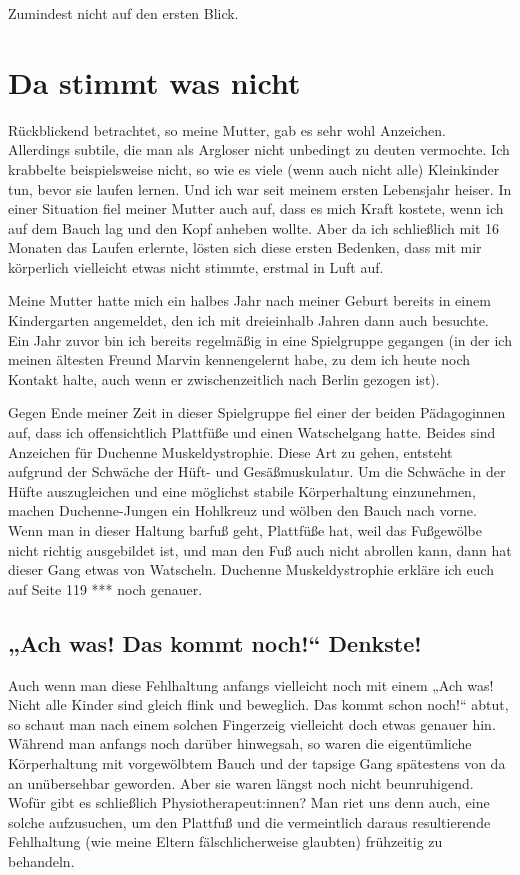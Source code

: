 \documentclass[fontsize=14pt,a4paper,headinclude,DIV=calc,automark]{scrbook}
\begin{document}
\noindent Zumindest nicht auf den ersten Blick.

\section{Da stimmt was nicht}
Rückblickend betrachtet, so meine Mutter, gab es sehr wohl Anzeichen. Allerdings subtile, die man als Argloser nicht unbedingt zu deuten vermochte. Ich krabbelte beispielsweise nicht, so wie es viele (wenn auch nicht alle) Kleinkinder tun, bevor sie laufen lernen. Und ich war seit meinem ersten Lebensjahr heiser. In einer Situation fiel meiner Mutter auch auf, dass es mich Kraft kostete, wenn ich auf dem Bauch lag und den Kopf anheben wollte. Aber da ich schließlich mit 16 Monaten das Laufen erlernte, lösten sich diese ersten Bedenken, dass mit mir körperlich vielleicht etwas nicht stimmte, erstmal in Luft auf.

Meine Mutter hatte mich ein halbes Jahr nach meiner Geburt bereits in einem Kindergarten angemeldet, den ich mit dreieinhalb Jahren dann auch besuchte. Ein Jahr zuvor bin ich bereits regelmäßig in eine Spielgruppe gegangen (in der ich meinen ältesten Freund Marvin kennengelernt habe, zu dem ich heute noch Kontakt halte, auch wenn er zwischenzeitlich nach Berlin gezogen ist).

Gegen Ende meiner Zeit in dieser Spielgruppe fiel einer der beiden Pädagoginnen auf, dass ich offensichtlich Plattfüße und einen Watschelgang hatte. Beides sind Anzeichen für Duchenne Muskeldystrophie. Diese Art zu gehen, entsteht aufgrund der Schwäche der Hüft- und Gesäßmuskulatur. Um die Schwäche in der Hüfte auszugleichen und eine möglichst stabile Körperhaltung einzunehmen, machen Duchenne-Jungen ein Hohlkreuz und wölben den Bauch nach vorne. Wenn man in dieser Haltung barfuß geht, Plattfüße hat, weil das Fußgewölbe nicht richtig ausgebildet ist, und man den Fuß auch nicht abrollen kann, dann hat dieser Gang etwas von Watscheln. Duchenne Muskeldystrophie erkläre ich euch auf Seite 119 *** noch genauer.

\subsection{„Ach was! Das kommt noch!“ Denkste!}

Auch wenn man diese Fehlhaltung anfangs vielleicht noch mit einem „Ach was! Nicht alle Kinder sind gleich flink und beweglich. Das kommt schon noch!“ abtut, so schaut man nach einem solchen Fingerzeig vielleicht doch etwas genauer hin. Während man anfangs noch darüber hinwegsah, so waren die eigentümliche Körperhaltung mit vorgewölbtem Bauch und der tapsige Gang spätestens von da an unübersehbar geworden. Aber sie waren längst noch nicht beunruhigend. Wofür gibt es schließlich Physiotherapeut:innen? Man riet uns denn auch, eine solche aufzusuchen, um den Plattfuß und die vermeintlich daraus resultierende Fehlhaltung (wie meine Eltern fälschlicherweise glaubten) frühzeitig zu behandeln.
              
\end{document}
